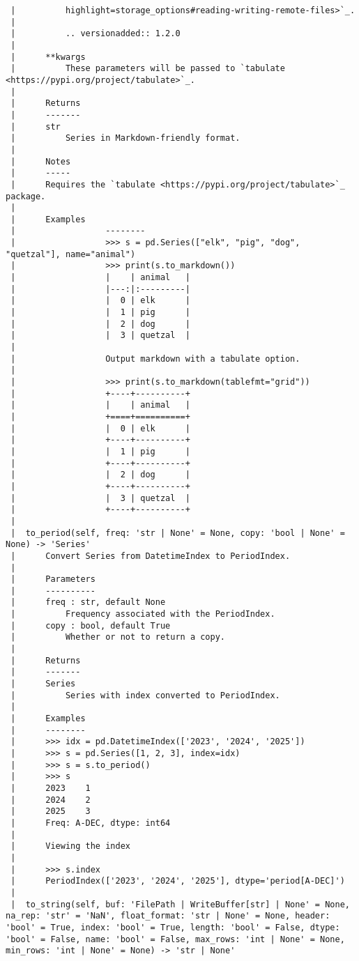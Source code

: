 \documentclass[
  letterpaper,
  DIV=11,
  numbers=noendperiod]{scrreprt}
\begin{document}
\begin{verbatim}
 |          highlight=storage_options#reading-writing-remote-files>`_.
 |      
 |          .. versionadded:: 1.2.0
 |      
 |      **kwargs
 |          These parameters will be passed to `tabulate                 <https://pypi.org/project/tabulate>`_.
 |      
 |      Returns
 |      -------
 |      str
 |          Series in Markdown-friendly format.
 |      
 |      Notes
 |      -----
 |      Requires the `tabulate <https://pypi.org/project/tabulate>`_ package.
 |      
 |      Examples
 |                  --------
 |                  >>> s = pd.Series(["elk", "pig", "dog", "quetzal"], name="animal")
 |                  >>> print(s.to_markdown())
 |                  |    | animal   |
 |                  |---:|:---------|
 |                  |  0 | elk      |
 |                  |  1 | pig      |
 |                  |  2 | dog      |
 |                  |  3 | quetzal  |
 |      
 |                  Output markdown with a tabulate option.
 |      
 |                  >>> print(s.to_markdown(tablefmt="grid"))
 |                  +----+----------+
 |                  |    | animal   |
 |                  +====+==========+
 |                  |  0 | elk      |
 |                  +----+----------+
 |                  |  1 | pig      |
 |                  +----+----------+
 |                  |  2 | dog      |
 |                  +----+----------+
 |                  |  3 | quetzal  |
 |                  +----+----------+
 |  
 |  to_period(self, freq: 'str | None' = None, copy: 'bool | None' = None) -> 'Series'
 |      Convert Series from DatetimeIndex to PeriodIndex.
 |      
 |      Parameters
 |      ----------
 |      freq : str, default None
 |          Frequency associated with the PeriodIndex.
 |      copy : bool, default True
 |          Whether or not to return a copy.
 |      
 |      Returns
 |      -------
 |      Series
 |          Series with index converted to PeriodIndex.
 |      
 |      Examples
 |      --------
 |      >>> idx = pd.DatetimeIndex(['2023', '2024', '2025'])
 |      >>> s = pd.Series([1, 2, 3], index=idx)
 |      >>> s = s.to_period()
 |      >>> s
 |      2023    1
 |      2024    2
 |      2025    3
 |      Freq: A-DEC, dtype: int64
 |      
 |      Viewing the index
 |      
 |      >>> s.index
 |      PeriodIndex(['2023', '2024', '2025'], dtype='period[A-DEC]')
 |  
 |  to_string(self, buf: 'FilePath | WriteBuffer[str] | None' = None, na_rep: 'str' = 'NaN', float_format: 'str | None' = None, header: 'bool' = True, index: 'bool' = True, length: 'bool' = False, dtype: 'bool' = False, name: 'bool' = False, max_rows: 'int | None' = None, min_rows: 'int | None' = None) -> 'str | None'

\end{verbatim}
\end{document}

